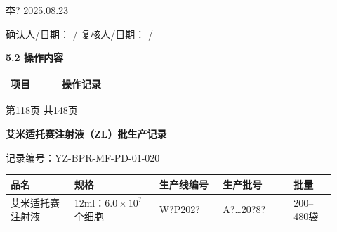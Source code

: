 \documentclass[UTF8,10pt,a4paper,fontset=fandol]{ctexart}
\newcommand{\fieldvalue}[1]{#1}
\newcommand{\handwritten}[1]{#1}
\begin{document}
\medskip

\fieldvalue{\handwritten{李?}}
\quad
\fieldvalue{\handwritten{2025.08.23}}

\medskip

确认人/日期：
\fieldvalue{\handwritten{/}}
\hfill
复核人/日期：
\fieldvalue{\handwritten{/}}

\medskip

\textbf{5.2 操作内容}

\begin{tabular}{|p{0.48\linewidth}|p{0.48\linewidth}|}
\hline
项目 & 操作记录 \\ \hline
\end{tabular}

\begin{center}
{\small 第118页 共148页}
\end{center}

\newpage

\begin{center}
\textbf{艾米适托赛注射液（ZL）批生产记录}
\end{center}

\noindent
记录编号：YZ-BPR-MF-PD-01-020

\begin{center}
\begin{tabular}{|p{0.18\linewidth}|p{0.24\linewidth}|p{0.18\linewidth}|p{0.20\linewidth}|p{0.12\linewidth}|}
\hline
品名 & 规格 & 生产线编号 & 生产批号 & 批量 \\
\hline
\fieldvalue{艾米适托赛注射液}
&
\fieldvalue{12ml：$6.0\times10^{?}$个细胞}
&
\fieldvalue{\handwritten{W?P202?}}
&
\fieldvalue{\handwritten{A?…20?8?}}
&
\fieldvalue{200--480袋}
\\
\hline
\end{tabular}
\end{center}
\end{document}
